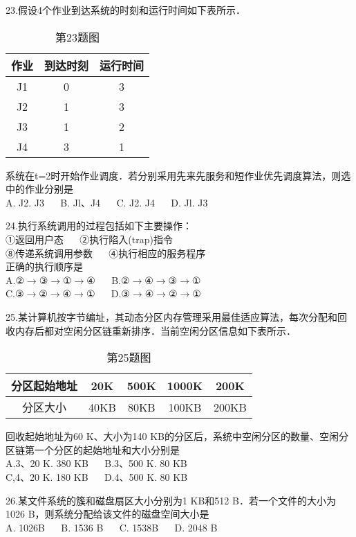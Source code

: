 23.假设4个作业到达系统的时刻和运行时间如下表所示．
\begin{table}[ht]
\centering
\caption{第23题图}\label{CSN17_tab1}
\begin{tabular}{|c|c|c|}
\hline
作业 & 到达时刻 & 运行时间 \\
\hline
J1 & 0 & 3 \\
\hline
J2 & 1 & 3 \\
\hline
J3 & 1 & 2 \\
\hline
J4 & 3 & 1 \\
\hline
\end{tabular}
\end{table}
系统在t=2时开始作业调度．若分别采用先来先服务和短作业优先调度算法，则选中的作业分别是 \\
A. J2. J3  $\quad$  B. Jl、J4  $\quad$  C. J2. J4  $\quad$  D. Jl. J3

24.执行系统调用的过程包括如下主要操作： \\
①返回用户态  $\quad$  ②执行陷入(trap)指令 \\
⑧传递系统调用参数  $\quad$ ④执行相应的服务程序 \\
正确的执行顺序是 \\
A.②$\rightarrow$③$\rightarrow$①$\rightarrow$④ $\quad$ B.②$\rightarrow$④$\rightarrow$③$\rightarrow$① \\
C.③$\rightarrow$②$\rightarrow$④$\rightarrow$① $\quad$ D.③$\rightarrow$④$\rightarrow$②$\rightarrow$①

25.某计算机按字节编址，其动态分区内存管理采用最佳适应算法，每次分配和回收内存后都对空闲分区链重新排序．当前空闲分区信息如下表所示． \\
\begin{table}[ht]
\centering
\caption{第25题图}\label{CSN17_tab2}
\begin{tabular}{|c|c|c|c|c|}
\hline
分区起始地址 & 20K & 500K & 1000K & 200K \\
\hline
分区大小 & 40KB & 80KB & 100KB & 200KB \\
\hline
\end{tabular}
\end{table}
回收起始地址为60 K、大小为140 KB的分区后，系统中空闲分区的数量、空闲分区链第一个分区的起始地址和大小分别是 \\
A.3、20 K. 380 KB  $\quad$  B.3、500 K.  80 KB \\
C,4、20 K.  180 KB  $\quad$  D.4、500 K.  80 KB

26.某文件系统的簇和磁盘扇区大小分别为1 KB和512 B．若一个文件的大小为1026 B，则系统分配给该文件的磁盘空间大小是 \\
A. 1026B  $\quad$  B.  1536 B  $\quad$  C. 1538B  $\quad$  D.  2048 B

